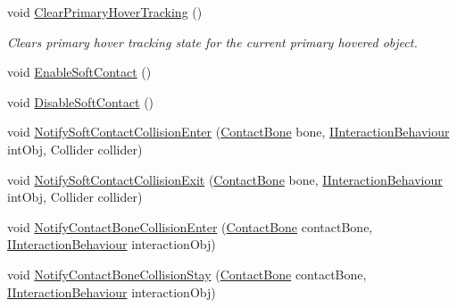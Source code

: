 \begin{DoxyCompactItemize}
void \mbox{\hyperlink{class_leap_1_1_unity_1_1_interaction_1_1_interaction_controller_a023df36bea05721df061204ea1e3fc65}{Clear\+Primary\+Hover\+Tracking}} ()
\begin{DoxyCompactList}\small\item\em Clears primary hover tracking state for the current primary hovered object. \end{DoxyCompactList}\item 
void \mbox{\hyperlink{class_leap_1_1_unity_1_1_interaction_1_1_interaction_controller_a1ca697cb7222397e5047941731edd03b}{Enable\+Soft\+Contact}} ()
\item 
void \mbox{\hyperlink{class_leap_1_1_unity_1_1_interaction_1_1_interaction_controller_a4eb0f0252af42b94cc6ec92d02e365af}{Disable\+Soft\+Contact}} ()
\item 
void \mbox{\hyperlink{class_leap_1_1_unity_1_1_interaction_1_1_interaction_controller_a85e7d1ae481b963c1b002b3ad447679a}{Notify\+Soft\+Contact\+Collision\+Enter}} (\mbox{\hyperlink{class_leap_1_1_unity_1_1_interaction_1_1_contact_bone}{Contact\+Bone}} bone, \mbox{\hyperlink{interface_leap_1_1_unity_1_1_interaction_1_1_i_interaction_behaviour}{I\+Interaction\+Behaviour}} int\+Obj, Collider collider)
\item 
void \mbox{\hyperlink{class_leap_1_1_unity_1_1_interaction_1_1_interaction_controller_a3cbc9651adc83ff8012cad6fa299beaf}{Notify\+Soft\+Contact\+Collision\+Exit}} (\mbox{\hyperlink{class_leap_1_1_unity_1_1_interaction_1_1_contact_bone}{Contact\+Bone}} bone, \mbox{\hyperlink{interface_leap_1_1_unity_1_1_interaction_1_1_i_interaction_behaviour}{I\+Interaction\+Behaviour}} int\+Obj, Collider collider)
\item 
void \mbox{\hyperlink{class_leap_1_1_unity_1_1_interaction_1_1_interaction_controller_a879fe5f12fdb87f95b08b50dc492fb5f}{Notify\+Contact\+Bone\+Collision\+Enter}} (\mbox{\hyperlink{class_leap_1_1_unity_1_1_interaction_1_1_contact_bone}{Contact\+Bone}} contact\+Bone, \mbox{\hyperlink{interface_leap_1_1_unity_1_1_interaction_1_1_i_interaction_behaviour}{I\+Interaction\+Behaviour}} interaction\+Obj)
\item 
void \mbox{\hyperlink{class_leap_1_1_unity_1_1_interaction_1_1_interaction_controller_a84a7f5e9c214510936475e37c65f0a3c}{Notify\+Contact\+Bone\+Collision\+Stay}} (\mbox{\hyperlink{class_leap_1_1_unity_1_1_interaction_1_1_contact_bone}{Contact\+Bone}} contact\+Bone, \mbox{\hyperlink{interface_leap_1_1_unity_1_1_interaction_1_1_i_interaction_behaviour}{I\+Interaction\+Behaviour}} interaction\+Obj)
\item 

\end{DoxyCompactItemize}
